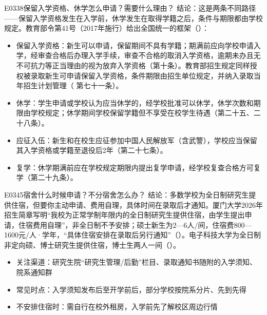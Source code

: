 \begin{qa}{E0338}{保留入学资格、休学怎么申请？需要什么理由？}
结论：这是两条不同路径——保留入学资格发生在入学前，休学发生在取得学籍之后，条件与期限都由学校规定。教育部令第41号（2017年施行）给出全国统一的框架（）：

\begin{itemize}
  \item 保留入学资格：新生可以申请，保留期间不具有学籍；期满前应向学校申请入学，经审查合格后办理入学手续，审查不合格的取消入学资格，逾期未办且无不可抗力等正当理由的视为放弃入学资格（第十条）。教育部招生规定同样授权被录取新生可申请保留入学资格，条件期限由招生单位规定，并纳入录取当年招生计划管理（ 第七十一条）。
  \item 休学：学生申请或学校认为应当休学的，经学校批准可以休学，休学次数和期限由学校规定；休学期间学校保留学籍但不享受在校学生待遇（第二十五、二十八条）。
  \item 应征入伍：新生和在校生应征参加中国人民解放军（含武警），学校应当保留其入学资格或学籍至退役后2年（第二十七条）。
  \item 复学：休学期满前应在学校规定期限内提出复学申请，经学校复查合格方可复学（第二十九条）。
\end{itemize}
\end{qa}

\begin{qa}{E0345}{宿舍什么时候申请？不分宿舍怎么办？}
结论：多数学校为全日制研究生提供住宿，但要你主动申请、费用自理，具体时间在录取后才通知。厦门大学2026年招生简章写明“我校为正常学制年限内的全日制研究生提供住宿，由学生提出申请，住宿费用自理”，非全日制不予安排；硕士新生为2—6人/间，住宿费800—1600元/人·学年，“具体住宿安排在录取后另行通知”（）。电子科技大学为全日制非定向硕、博士研究生提供住宿，博士生两人一间（）。

\begin{itemize}
  \item 关注渠道：研究生院“研究生管理/后勤”栏目、录取通知书随附的入学须知、院系通知群
  \item 常见时点：入学须知发布后至开学前后，部分学校按院系分片、先到先得
  \item 不安排住宿时：需自行在校外租房，入学前先了解校区周边行情
\end{itemize}
\end{qa}

